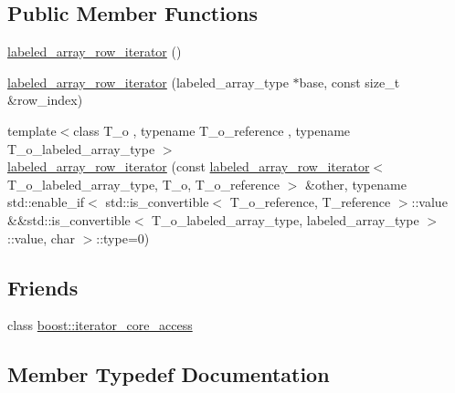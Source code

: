 \subsection*{Public Member Functions}
\begin{DoxyCompactItemize}
\item 
\hyperlink{classIceBRG_1_1labeled__array__row__iterator_adc441238b4a562135defd2c6c95bb887}{labeled\+\_\+array\+\_\+row\+\_\+iterator} ()
\item 
\hyperlink{classIceBRG_1_1labeled__array__row__iterator_a629176c37571e2f2ca3ca87ca39558af}{labeled\+\_\+array\+\_\+row\+\_\+iterator} (labeled\+\_\+array\+\_\+type $\ast$base, const size\+\_\+t \&row\+\_\+index)
\item 
{\footnotesize template$<$class T\+\_\+o , typename T\+\_\+o\+\_\+reference , typename T\+\_\+o\+\_\+labeled\+\_\+array\+\_\+type $>$ }\\\hyperlink{classIceBRG_1_1labeled__array__row__iterator_a18186784ffabffb098a7c1c9889f4bb6}{labeled\+\_\+array\+\_\+row\+\_\+iterator} (const \hyperlink{classIceBRG_1_1labeled__array__row__iterator}{labeled\+\_\+array\+\_\+row\+\_\+iterator}$<$ T\+\_\+o\+\_\+labeled\+\_\+array\+\_\+type, T\+\_\+o, T\+\_\+o\+\_\+reference $>$ \&other, typename std\+::enable\+\_\+if$<$ std\+::is\+\_\+convertible$<$ T\+\_\+o\+\_\+reference, T\+\_\+reference $>$\+::value \&\&std\+::is\+\_\+convertible$<$ T\+\_\+o\+\_\+labeled\+\_\+array\+\_\+type, labeled\+\_\+array\+\_\+type $>$\+::value, char $>$\+::type=0)
\end{DoxyCompactItemize}
\subsection*{Friends}
\begin{DoxyCompactItemize}
\item 
class \hyperlink{classIceBRG_1_1labeled__array__row__iterator_ac09f73e325921cc50ebcd96bed0f8096}{boost\+::iterator\+\_\+core\+\_\+access}
\end{DoxyCompactItemize}


\subsection{Member Typedef Documentation}
\hypertarget{classIceBRG_1_1labeled__array__row__iterator_a3ac7f5a854882d443faaef1ae3ef3c9d}{}
